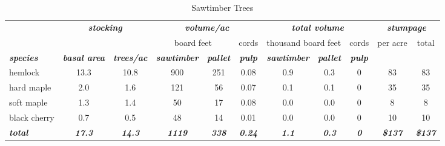 \documentclass[landscape]{article}
\begin{document}
\begin{table}[H]

\caption{\label{tab:unnamed-chunk-33}Sawtimber Trees}
\fontsize{10}{12}\selectfont
\begin{tabular}[t]{lcccccccccc}
\toprule
\multicolumn{1}{c}{\em{\textbf{ }}} & \multicolumn{2}{c}{\em{\textbf{stocking}}} & \multicolumn{3}{c}{\em{\textbf{volume/ac }}} & \multicolumn{3}{c}{\em{\textbf{total volume}}} & \multicolumn{2}{c}{\em{\textbf{stumpage}}} \\
\cmidrule(l{3pt}r{3pt}){2-3} \cmidrule(l{3pt}r{3pt}){4-6} \cmidrule(l{3pt}r{3pt}){7-9} \cmidrule(l{3pt}r{3pt}){10-11}
\multicolumn{3}{c}{ } & \multicolumn{2}{c}{board feet} & \multicolumn{1}{c}{cords} & \multicolumn{2}{c}{thousand board feet} & \multicolumn{1}{c}{cords} & \multicolumn{1}{c}{per acre} & \multicolumn{1}{c}{total} \\
\cmidrule(l{3pt}r{3pt}){4-5} \cmidrule(l{3pt}r{3pt}){6-6} \cmidrule(l{3pt}r{3pt}){7-8} \cmidrule(l{3pt}r{3pt}){9-9} \cmidrule(l{3pt}r{3pt}){10-10} \cmidrule(l{3pt}r{3pt}){11-11}
\rowcolor[HTML]{DCDCDC}  \em{\textbf{species}} & \em{\textbf{basal area}} & \em{\textbf{trees/ac}} & \em{\textbf{sawtimber}} & \em{\textbf{pallet}} & \em{\textbf{pulp}} & \em{\textbf{sawtimber}} & \em{\textbf{pallet}} & \em{\textbf{pulp}} & \em{\textbf{ }} & \em{\textbf{ }}\\
\midrule
\rowcolor{gray!6}  hemlock & 13.3 & 10.8 & 900 & 251 & 0.08 & 0.9 & 0.3 & 0 & 83 & 83\\
 
hard maple & 2.0 & 1.6 & 121 & 56 & 0.07 & 0.1 & 0.1 & 0 & 35 & 35\\
 
\rowcolor{gray!6}  soft maple & 1.3 & 1.4 & 50 & 17 & 0.08 & 0.0 & 0.0 & 0 & 8 & 8\\
 
black cherry & 0.7 & 0.5 & 48 & 14 & 0.01 & 0.0 & 0.0 & 0 & 10 & 10\\
 
\rowcolor{gray!6}  \rowcolor[HTML]{DCDCDC}  \em{\textbf{total}} & \em{\textbf{17.3}} & \em{\textbf{14.3}} & \em{\textbf{1119}} & \em{\textbf{338}} & \em{\textbf{0.24}} & \em{\textbf{1.1}} & \em{\textbf{0.3}} & \em{\textbf{0}} & \em{\textbf{\$137}} & \em{\textbf{\$137}}\\
\bottomrule
\end{tabular}
\end{table}
\end{document}
